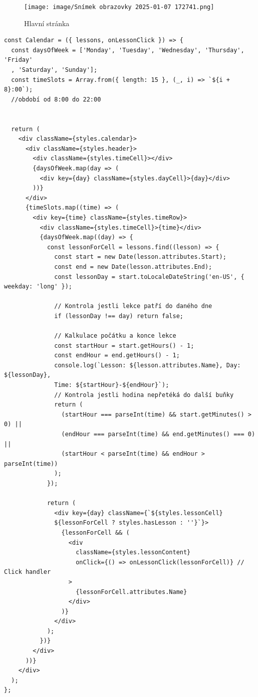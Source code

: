 \documentclass[12pt, a4paper,
openright
]{report}
\begin{document}
	        \begin{figure}[h]
	            \centering
	            \texttt{[image: image/Snímek obrazovky 2025-01-07 172741.png]}
	            \caption{Hlavní stránka}
	            \label{fig:enter-label}
	        \end{figure}
	    	    
    \begin{lstlisting}[style=Python, caption={Ukázka řešení kalendáře}, basicstyle=\footnotesize\ttfamily]
	const Calendar = ({ lessons, onLessonClick }) => {
  const daysOfWeek = ['Monday', 'Tuesday', 'Wednesday', 'Thursday', 'Friday'
  , 'Saturday', 'Sunday'];
  const timeSlots = Array.from({ length: 15 }, (_, i) => `${i + 8}:00`); 
  //období od 8:00 do 22:00


  return (
    <div className={styles.calendar}>
      <div className={styles.header}>
        <div className={styles.timeCell}></div>
        {daysOfWeek.map(day => (
          <div key={day} className={styles.dayCell}>{day}</div>
        ))}
      </div>
      {timeSlots.map((time) => (
        <div key={time} className={styles.timeRow}>
          <div className={styles.timeCell}>{time}</div>
          {daysOfWeek.map((day) => {
            const lessonForCell = lessons.find((lesson) => {
              const start = new Date(lesson.attributes.Start);
              const end = new Date(lesson.attributes.End);
              const lessonDay = start.toLocaleDateString('en-US', { weekday: 'long' });

              // Kontrola jestli lekce patří do daného dne
              if (lessonDay !== day) return false;

              // Kalkulace počátku a konce lekce
              const startHour = start.getHours() - 1;
              const endHour = end.getHours() - 1;
              console.log(`Lesson: ${lesson.attributes.Name}, Day: ${lessonDay}, 
              Time: ${startHour}-${endHour}`);
              // Kontrola jestli hodina nepřetéká do další buňky
              return (
                (startHour === parseInt(time) && start.getMinutes() > 0) ||
                (endHour === parseInt(time) && end.getMinutes() === 0) ||
                (startHour < parseInt(time) && endHour > parseInt(time))
              );
            });

            return (
              <div key={day} className={`${styles.lessonCell} 
              ${lessonForCell ? styles.hasLesson : ''}`}>
                {lessonForCell && (
                  <div
                    className={styles.lessonContent}
                    onClick={() => onLessonClick(lessonForCell)} // Click handler
                  >
                    {lessonForCell.attributes.Name}
                  </div>
                )}
              </div>
            );
          })}
        </div>
      ))}
    </div>
  );
};
\end{lstlisting}
\clearpage
\end{document}
